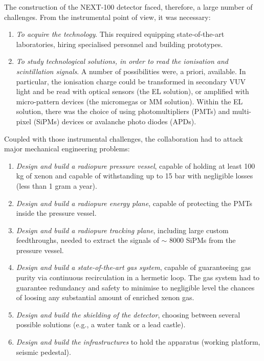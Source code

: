 The construction of the NEXT-100 detector faced, therefore, a large number of challenges. From the instrumental point of view, it was necessary:

\begin{enumerate}
\item {\em To acquire the technology}. This required equipping state-of-the-art laboratories, hiring specialised personnel and building prototypes.
\item {\em To study technological solutions, in order to read the ionisation and scintillation signals}. A number of possibilities were, a priori, available. In particular, the ionisation charge could be transformed in secondary VUV light and be read with optical sensors (the EL solution), or amplified with micro-pattern devices (the micromegas or MM solution). Within the EL solution, there was the choice of using photomultipliers (PMTs) and multi-pixel (SiPMs) devices or avalanche photo diodes (APDs). 
\end{enumerate}

Coupled with those instrumental challenges, the collaboration had to attack major mechanical engineering problems:

\begin{enumerate}
\item{\em Design and build a radiopure pressure vessel}, capable of holding at least 100 kg of xenon and capable of withstanding up to 15 bar with negligible losses (less than 1 gram a year). 
\item{\em Design and build a radiopure energy plane}, capable of protecting the PMTs inside the pressure vessel.
\item{\em Design and build a radiopure tracking plane}, including large custom feedthroughs, needed to extract the signals of $\sim$ 8000 SiPMs from the pressure vessel. 
\item{\em Design and build a state-of-the-art gas system}, capable of guaranteeing gas purity via continuous recirculation in a hermetic loop. The gas system had to guarantee redundancy and safety to minimise to negligible level the chances of loosing any substantial amount of enriched xenon gas. 
\item{\em Design and build the shielding of the detector}, choosing between several possible solutions (e.g., a water tank or a lead castle).
\item{\em Design and build the infrastructures} to hold the apparatus (working platform, seismic pedestal).
\end{enumerate}

